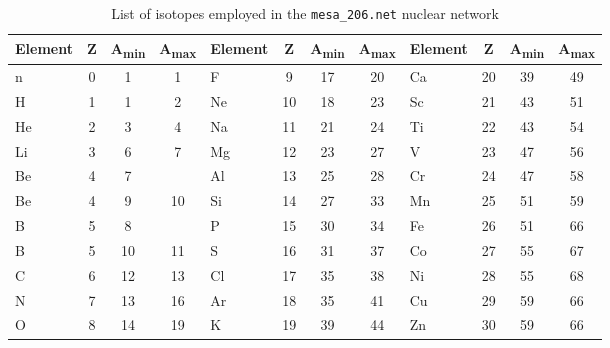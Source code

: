 \begin{table}[h!]
    \centering
    \begin{tabular}{>{\raggedright\arraybackslash}p{1.5cm} c c c | >{\raggedright\arraybackslash}p{1.5cm} c c c | >{\raggedright\arraybackslash}p{1.5cm} c c c}
        \hline\hline
        \textbf{Element} & \textbf{Z} & \textbf{A\textsubscript{min}} & \textbf{A\textsubscript{max}} & \textbf{Element} & \textbf{Z} & \textbf{A\textsubscript{min}} & \textbf{A\textsubscript{max}} & \textbf{Element} & \textbf{Z} & \textbf{A\textsubscript{min}} & \textbf{A\textsubscript{max}} \\
        \hline
        n & 0 & 1 & 1 & F & 9 & 17 & 20 & Ca & 20 & 39 & 49  \\
        H & 1 & 1 & 2 & Ne & 10 & 18 & 23 & Sc & 21 & 43 & 51 \\
        He & 2 & 3 & 4 & Na & 11 & 21 & 24 & Ti & 22 & 43 & 54 \\
        Li & 3 & 6 & 7 &  Mg & 12 & 23 & 27 & V & 23 & 47 & 56 \\
        Be & 4 & 7 & & Al & 13 & 25 & 28 & Cr & 24 & 47 & 58  \\
        Be & 4 & 9 &10 & Si & 14 & 27 & 33 & Mn & 25 & 51 & 59 \\
        B & 5 & 8 & & P & 15 & 30 & 34 & Fe & 26 & 51 & 66 \\
        B & 5 & 10 & 11 & S & 16 & 31 & 37 & Co & 27 & 55 & 67\\
        C & 6 & 12 & 13 & Cl & 17 & 35 & 38 & Ni & 28 & 55 & 68 \\
        N & 7 & 13 & 16 & Ar & 18 & 35 & 41 & Cu & 29 & 59 & 66 \\
        O & 8 & 14 & 19 & K & 19 & 39 & 44& Zn & 30 & 59 & 66  \\ 
        \hline
    \end{tabular}
    \caption{List of isotopes employed in the \texttt{mesa\_206.net} nuclear network}
    \label{tab:m206}
\end{table}
